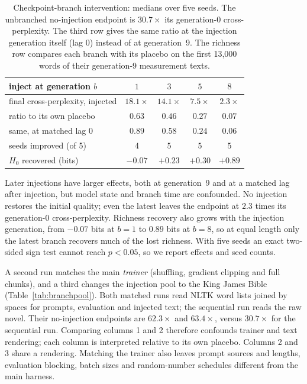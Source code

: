\documentclass[10pt]{article}
\theoremstyle{plain}
\theoremstyle{definition}
\newcommand{\Hz}{H_0}
\begin{document}
\begin{table}[ht]
\centering\small
\caption{Checkpoint-branch intervention: medians over five seeds. The unbranched no-injection
endpoint is $30.7\times$ its generation-0 cross-perplexity. The third row gives the same ratio at
the injection generation itself (lag 0) instead of at generation~9. The richness row compares each
branch with its placebo on the first 13,000 words of their generation-9 measurement texts.}
\label{tab:branch}
\begin{tabular}{lcccc}
\toprule
inject at generation $b$ & $1$ & $3$ & $5$ & $8$ \\
\midrule
final cross-perplexity, injected & $18.1\times$ & $14.1\times$ & $7.5\times$ & $\mathbf{2.3\times}$ \\
\;\;ratio to its own placebo & $0.63$ & $0.46$ & $0.27$ & $\mathbf{0.07}$ \\
\;\;same, at matched lag $0$ & $0.89$ & $0.58$ & $0.24$ & $0.06$ \\
seeds improved (of 5) & $4$ & $5$ & $5$ & $5$ \\
$\Hz$ recovered (bits) & $-0.07$ & $+0.23$ & $+0.30$ & $\mathbf{+0.89}$ \\
\bottomrule
\end{tabular}
\end{table}

Later injections have larger effects, both at generation~9 and at a matched lag after injection,
but model state and branch time are confounded. No injection restores the initial quality;
even the latest leaves the endpoint at $2.3$ times its generation-0 cross-perplexity. Richness
recovery also grows with the injection generation, from $-0.07$ bits at $b=1$ to $0.89$ bits at
$b=8$, so at equal length only the latest branch recovers much of the lost richness.
With five seeds an exact two-sided sign test cannot reach $p<0.05$, so we report effects and seed
counts.

A second run matches the main \emph{trainer} (shuffling, gradient clipping and full chunks), and a
third changes the injection pool to the King James Bible (Table~\ref{tab:branchpool}). Both
matched runs read NLTK word lists joined by spaces for prompts, evaluation and injected text;
the sequential run reads the raw novel. Their no-injection endpoints are $62.3\times$ and
$63.4\times$, versus $30.7\times$ for the sequential run. Comparing columns 1 and 2 therefore
confounds trainer and text rendering; each column is interpreted relative to its own placebo.
Columns 2 and 3 share a rendering. Matching the trainer also leaves prompt sources and lengths,
evaluation blocking, batch sizes and random-number schedules different from the main harness.
\end{document}
